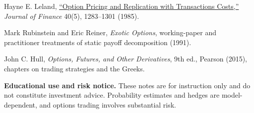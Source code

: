\documentclass[11pt]{article}
\begin{document}
\begin{readinglist}
  \item Hayne E. Leland, \href{https://doi.org/10.1111/j.1540-6261.1985.tb02383.x}{``Option Pricing and Replication with Transactions Costs,''} \emph{Journal of Finance} 40(5), 1283--1301 (1985).
  \item Mark Rubinstein and Eric Reiner, \emph{Exotic Options}, working-paper and practitioner treatments of static payoff decomposition (1991).
  \item John C. Hull, \emph{Options, Futures, and Other Derivatives}, 9th ed., Pearson (2015), chapters on trading strategies and the Greeks.
\end{readinglist}

\vfill
{\sffamily\footnotesize\color{vnmuted}\textbf{Educational use and risk notice.} These notes are for instruction only and do not constitute investment advice. Probability estimates and hedges are model-dependent, and options trading involves substantial risk.}
\end{document}
